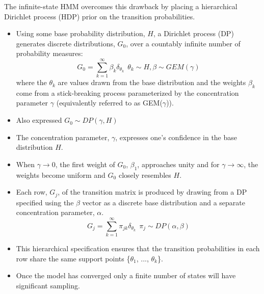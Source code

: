 \documentclass{article}
\begin{document}
  The infinite-state HMM overcomes this drawback by placing a hierarchical
  Dirichlet process (HDP) prior on the transition probabilities.
  \begin{itemize}
    \item Using some base probability distribution, $H$, a Dirichlet process 
    (DP) generates discrete distributions, $G_0$, over a countably infinite 
    number of probability measures:
    \begin{equation}
      G_0 = \sum_{k=1}^{\infty} \beta_k \delta_{\theta_k} ~~ \theta_k \sim H, \beta \sim GEM(\gamma)
    \end{equation}
    where the $\theta_k$ are values drawn from the base distribution and the
    weights $\beta_k$ come from a stick-breaking process parameterized by the  
    concentration parameter $\gamma$ (equivalently referred to as GEM($\gamma$)). 
    \item Also expressed $G_0 \sim DP(\gamma, H)$
    \item The concentration parameter, $\gamma$, expresses one's confidence in the 
    base distribution $H$. 
    \item When $\gamma\to 0$, the first weight of $G_0$, $\beta_1$, approaches 
    unity and for $\gamma\to\infty$, the weights become uniform and $G_0$ closely
    resembles $H$.
    \item Each row, $G_j$, of the transition matrix is produced by drawing from a DP specified 
    using the $\beta$ vector as a discrete base distribution and a separate concentration
    parameter, $\alpha$.
    \begin{equation}
      G_j = \sum_{k=1}^{\infty} \pi_{jk} \delta_{\theta_k} ~~ \pi_j \sim DP(\alpha, \beta)
    \end{equation}
    \item This hierarchical specification ensures that the transition probabilities in 
    each row share the same support points \{$\theta_1$, ..., $\theta_k$\}.
    \item Once the model has converged only a finite number of states will have significant
    sampling.
  \end{itemize}
  
\end{document}
